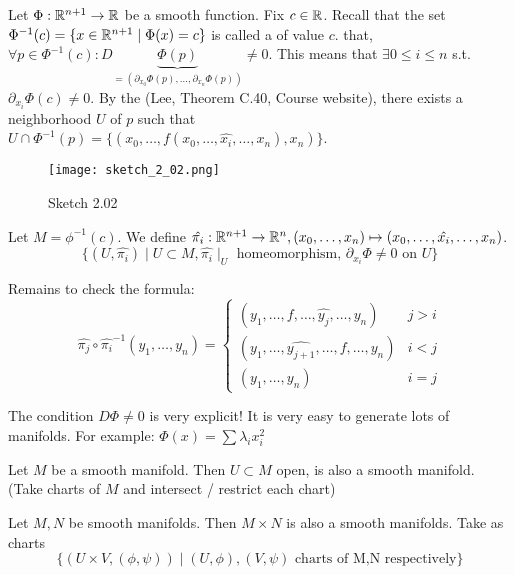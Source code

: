 \begin{example}
    Let \(\Phi:\mathbb{R}^{n+1}\to\mathbb{R}\) be a smooth function. Fix \(c\in\mathbb{R}\). Recall that the set \(\Phi^{-1}(c)=\{x\in\mathbb{R}^{n+1}\mid \Phi(x)=c\}\)
    is called a  of value \(c\).  that, \(\forall p\in \Phi^{-1}(c):D\underbrace{\Phi(p)}_{=(\partial_{x_0}\Phi(p),\dots,\partial_{x_n}\Phi(p))}\neq 0\).
    This means that \(\exists 0\leq i\leq n\) s.t. \(\partial_{x_i}\Phi(c)\neq0\). By the  (Lee, Theorem C.40, Course website),
    there exists a neighborhood \(U\) of \(p\) such that \(U\cap\Phi^{-1}(p)=\{(x_0,\dots,f(x_0,\dots,\hat{x_i},\dots,x_n),x_n)\}\).
    \begin{figure}[H]
        \centering
        \texttt{[image: sketch\_2\_02.png]}
        \caption{Sketch 2.02}
    \end{figure}

    Let \(M=\phi^{-1}(c)\). We define \(\hat{\pi_i}:\mathbb{R}^{n+1}\to\mathbb{R}^n,(x_0,\dots,x_n)\mapsto (x_0,\dots,\hat{x_i},\dots,x_n)\).
    \[\{(U,\hat{\pi_i})\mid U\subset M, \hat{\pi_i}\mid_U\text{ homeomorphism, } \partial_{x_i}\Phi\neq 0\text{ on } U\}\]

    Remains to check the formula:
    \[\hat{\pi_j}\circ \hat{\pi_i}^{-1}(y_1,\dots,y_n)=\begin{cases}
        (y_1,\dots,f,\dots,\hat{y_j},\dots,y_n)& j>i\\
        (y_1,\dots,\hat{y_{j+1}},\dots,f,\dots, y_n)& i<j\\
        (y_1,\dots,y_n) & i=j 
    \end{cases}\]
\end{example}

\begin{remark}
    The condition \(D\Phi\neq 0\) is very explicit! It is very easy to generate lots of manifolds. For example: \(\Phi(x)=\sum \lambda_i x_i^2\)
\end{remark}

\begin{example} Let \(M\) be a smooth manifold. Then 
     \(U\subset M\) open, is also a smooth manifold. (Take charts of \(M\) and intersect / restrict each chart)
\end{example}

\begin{example} Let \(M,N\) be smooth manifolds. Then \(M\times N\) is also a 
    smooth manifolds. Take as charts 
    \[\{(U\times V, (\phi,\psi))\mid (U,\phi),(V,\psi)\text{ charts of M,N respectively}\}\]
\end{example}

